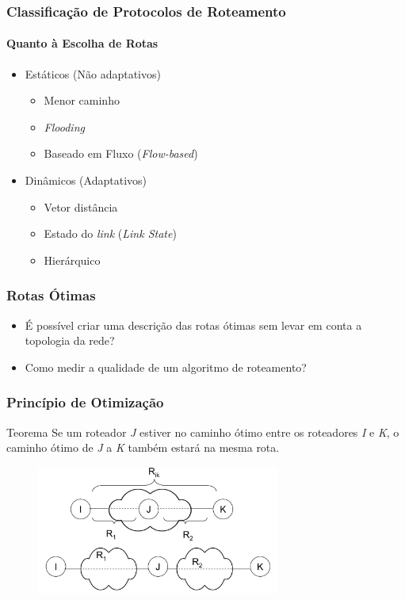 \documentclass{beamer}
\begin{document}
\begin{frame}
\frametitle{Classificação de Protocolos de Roteamento}
\framesubtitle{Quanto à Escolha de Rotas}
\begin{itemize}
  \item Estáticos (Não adaptativos)
  \begin{itemize}
     \item Menor caminho
     \item \emph{Flooding}
     \item Baseado em Fluxo (\emph{Flow-based}) 
  \end{itemize}
  \item Dinâmicos (Adaptativos)
  \begin{itemize}
     \item Vetor distância
     \item Estado do \emph{link} (\emph{Link State})
     \item Hierárquico 
  \end{itemize}
\end{itemize}

\end{frame}

\begin{frame}
\frametitle{Rotas Ótimas}
\begin{itemize}
  \setlength{\itemsep}{0.7cm}%
  \item É possível criar uma descrição das rotas ótimas sem levar em conta a
  topologia da rede?
  \item Como medir a qualidade de um algoritmo de roteamento?
\end{itemize}
\end{frame}

\begin{frame}
\frametitle{Princípio de Otimização}
\begin{block}{Teorema}
Se um roteador \emph{J} estiver no caminho ótimo entre os roteadores \emph{I} e \emph{K}, o caminho
ótimo de \emph{J} a \emph{K} também estará na mesma rota.
\end{block}
\begin{figure}[htp]
\begin{center}
  \includegraphics[width=80mm]{Imagens/PrincipioOtimizacao.jpeg}
  \label{principio_otimizacao}
\end{center}
\end{figure}
\end{frame}
\end{document}
